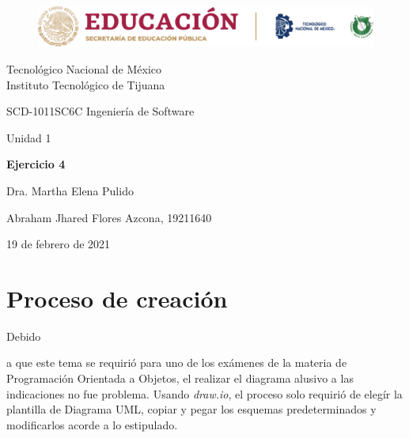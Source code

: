 \documentclass[stu, 12pt, letterpaper, donotrepeattitle, floatsintext, natbib]{apa7}
\begin{document}
    \begin{titlepage}
        \begin{figure}[ht]
            \centering
            \includegraphics[width=15cm]{logosITT.png}
        \end{figure}
        \centering
        {\Large Tecnológico Nacional de México\\Instituto Tecnológico de Tijuana\par}
        \vspace{1cm}
        {\Large SCD-1011SC6C Ingeniería de Software\par}
        \vspace{1cm}
        {\Large Unidad 1\par}
        \vspace{2cm}
        {\Large\bfseries Ejercicio 4\par}
        \vspace{2cm}
        {\large Dra. Martha Elena Pulido\par}
        \vfill
            {\large Abraham Jhared Flores Azcona, 19211640\par}
        \vfill
        {\large 19 de febrero de 2021}
    \end{titlepage}

\renewcommand\contentsname{Contenido}
\tableofcontents

\newpage
\section{Proceso de creación}
Debido \begin{justifying}
    a que este tema se requirió para uno de los exámenes de la materia de Programación Orientada a Objetos, el realizar el diagrama alusivo
    a las indicaciones no fue problema. Usando \emph{draw.io}, el proceso solo requirió de elegír la plantilla de Diagrama UML, copiar y pegar
    los esquemas predeterminados y modificarlos acorde a lo estipulado.\par
    \end{justifying}
\vspace{\baselineskip}
\end{document}
